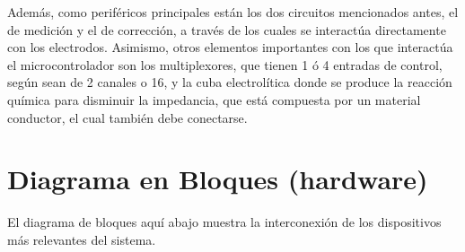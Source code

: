 Además, como periféricos principales están los dos circuitos mencionados antes, el de medición y el de corrección, a través de los cuales se interactúa directamente con los electrodos. Asimismo, otros elementos importantes con los que interactúa el microcontrolador son los multiplexores, que tienen 1 ó 4 entradas de control, según sean de 2 canales o 16, y la cuba electrolítica donde se produce la reacción química para disminuir la impedancia, que está compuesta por un material conductor, el cual también debe conectarse.



\section{Diagrama en Bloques (hardware)}
El diagrama de bloques aquí abajo muestra la interconexión de los dispositivos más relevantes del sistema.



